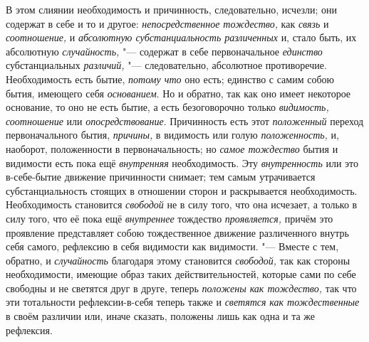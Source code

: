 \label{bkm:bm93a}В этом слиянии необходимость и причинность, следовательно,
исчезли; они содержат в себе и то и другое:
{\em непосредственное тождество,} как
{\em связь} и {\em соотношение,} и
{\em абсолютную субстанциальность различенных} и, стало
быть, их абсолютную {\em случайность,} "--- содержат в
себе первоначальное {\em единство} субстанциальных
{\em различий,} "--- следовательно, абсолютное
противоречие. Необходимость есть бытие, {\em потому
что} оно есть; единство с самим собою бытия, имеющего себя
{\em основанием}. Но и обратно, так как оно имеет
некоторое основание, то оно не есть бытие, а есть безоговорочно только
{\em видимость, соотношение} или
{\em опосредствование}. Причинность есть этот
{\em положенный} переход первоначального бытия,
{\em причины,} в видимость или голую
{\em положенность,} и, наоборот, положенности в
первоначальность; но {\em самое тождество} бытия и
видимости есть пока ещё {\em внутренняя} необходимость.
Эту {\em внутренность} или это в-себе-бытие движение
причинности снимает; тем самым утрачивается субстанциальность стоящих в
отношении сторон и раскрывается необходимость. Необходимость становится
{\em свободой} не в силу того, что она исчезает, а
только в силу того, что её пока ещё {\em внутреннее}
тождество {\em проявляется,} причём это проявление
представляет собою тождественное движение различенного внутрь себя самого,
рефлексию в себя видимости как видимости. "--- Вместе с тем, обратно, и
{\em случайность} благодаря этому становится
{\em свободой,} так как стороны необходимости, имеющие
образ таких действительностей, которые сами по себе свободны и не светятся
друг в друге, теперь {\em положены как тождество,} так
что эти тотальности рефлексии-в-себя теперь также и
{\em светятся} {\em как
тождественные} в своём различии или, иначе сказать, положены лишь как одна
и та же рефлексия.

